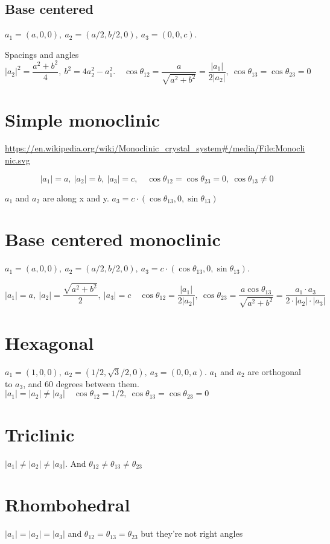 \documentclass[a4paper,10pt]{article} 	%
\numberwithin{equation}{section}
\begin{document}
	
	\subsection{Base centered}
	$ a_1 = (a,0,0),\ a_2 = (a/2,b/2,0),\ a_3 = (0,0,c) $.
	
	Spacings and angles
	\begin{equation}\label{key}
	|a_2|^2 = \frac{a^2+b^2}{4}, \ b^2 = 4a_2^2-a_1^2. \quad \cos \theta_{12} = \frac{a}{\sqrt{a^2+b^2}} = \frac{|a_1|}{2|a_2|}, \ \cos\theta_{13} = \cos \theta_{23} = 0
	\end{equation}
	
	\section{Simple monoclinic}
	\url{https://en.wikipedia.org/wiki/Monoclinic_crystal_system#/media/File:Monoclinic.svg}

	\begin{equation}\label{key}
		|a_1| = a,\ |a_2| = b,\ |a_3| = c, \quad \cos \theta_{12} = \cos \theta_{23} = 0, \ \cos \theta_{13} \neq 0
	\end{equation}
	
	$a_1$ and $a_2$ are along x and y. $a_3 = c \cdot (\cos \theta_{13},0,\sin \theta_{13})$
	
	\section{Base centered monoclinic}
	$ a_1 = (a,0,0),\ a_2 =(a/2, b/2,0),\ a_3 = c \cdot (\cos \theta_{13},0,\sin \theta_{13}) $.
	
	\begin{equation}\label{key}
	|a_1| = a,\ |a_2| = \frac{\sqrt{a^2+b^2}}{2}, \ |a_3| = c \quad \cos \theta_{12} = \frac{|a_1|}{2|a_2|}, \ \cos \theta_{23} = \frac{a\cos\theta_{13}}{\sqrt{a^2+b^2}} = \frac{a_1 \cdot a_3}{2 \cdot |a_2| \cdot |a_3|}
	\end{equation}
	
	
	\section{Hexagonal}
	$ a_1 = (1,0,0),\ a_2 = (1/2,\sqrt{3}/2,0),\ a_3 = (0,0,a) $. $a_1$ and $a_2$ are orthogonal to $a_3$, and 60 degrees between them.
	$|a_1| = |a_2| \neq |a_3| \quad \cos \theta_{12} = 1/2, \ \cos \theta_{13} = \cos \theta_{23} = 0$
	
	\section{Triclinic}
	$|a_1| \neq |a_2| \neq |a_3|$. And $\theta_{12} \neq \theta_{13} \neq \theta_{23}$
	
	\section{Rhombohedral}
	$|a_1| = |a_2| = |a_3|$ and $\theta_{12} = \theta_{13} = \theta_{23}$ but they're not right angles
\end{document}
